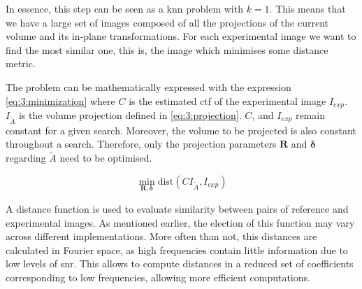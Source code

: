 \documentclass[../main.tex]{subfiles}
\begin{document}
In essence, this step can be seen as a \gls{knn}\cite{sorzano2021} problem with $k=1$. This means that we have a large set of images composed of all the projections of the current volume and its in-plane transformations. For each experimental image we want to find the most similar one, this is, the image which minimises some distance metric.

The problem can be mathematically expressed with the expression \eqref{eq:3:minimization} where $C$ is the estimated \gls{ctf} of the experimental image $I_{exp}$. $I_{\tilde{A}}$ is the volume projection defined in \eqref{eq:3:projection}. $C$, and $I_{exp}$ remain constant for a given search. Moreover, the volume to be projected is also constant throughout a search. Therefore, only the projection parameters $\bm{R}$ and $\bm{\delta}$ regarding $\tilde{A}$ need to be optimised.

\begin{equation}\label{eq:3:minimization}
    \min_{\bm{R}, \bm{\delta}} \text{dist}(C I_{\tilde{A}} , I_{exp})
\end{equation}

A distance function is used to evaluate similarity between pairs of reference and experimental images. As mentioned earlier, the election of this function may vary across different implementations. More often than not, this distances are calculated in Fourier space, as high frequencies contain little information due to low levels of \gls{snr}. This allows to compute distances in a reduced set of coefficients corresponding to low frequencies, allowing more efficient computations.
\end{document}
